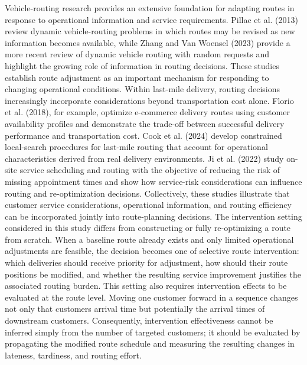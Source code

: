 \documentclass[
]{article}
\begin{document}
Vehicle-routing research provides an extensive foundation for adapting
routes in response to operational information and service requirements.
Pillac et al. (2013) review dynamic vehicle-routing problems in which
routes may be revised as new information becomes available, while Zhang
and Van Woensel (2023) provide a more recent review of dynamic vehicle
routing with random requests and highlight the growing role of
information in routing decisions. These studies establish route
adjustment as an important mechanism for responding to changing
operational conditions. Within last-mile delivery, routing decisions
increasingly incorporate considerations beyond transportation cost
alone. Florio et al. (2018), for example, optimize e-commerce delivery
routes using customer availability profiles and demonstrate the
trade-off between successful delivery performance and transportation
cost. Cook et al. (2024) develop constrained local-search procedures for
last-mile routing that account for operational characteristics derived
from real delivery environments. Ji et al. (2022) study on-site service
scheduling and routing with the objective of reducing the risk of
missing appointment times and show how service-risk considerations can
influence routing and re-optimization decisions. Collectively, these
studies illustrate that customer service considerations, operational
information, and routing efficiency can be incorporated jointly into
route-planning decisions. The intervention setting considered in this
study differs from constructing or fully re-optimizing a route from
scratch. When a baseline route already exists and only limited
operational adjustments are feasible, the decision becomes one of
selective route intervention: which deliveries should receive priority
for adjustment, how should their route positions be modified, and
whether the resulting service improvement justifies the associated
routing burden. This setting also requires intervention effects to be
evaluated at the route level. Moving one customer forward in a sequence
changes not only that customer\textquotesingle s arrival time but
potentially the arrival times of downstream customers. Consequently,
intervention effectiveness cannot be inferred simply from the number of
targeted customers; it should be evaluated by propagating the modified
route schedule and measuring the resulting changes in lateness,
tardiness, and routing effort.
\end{document}
